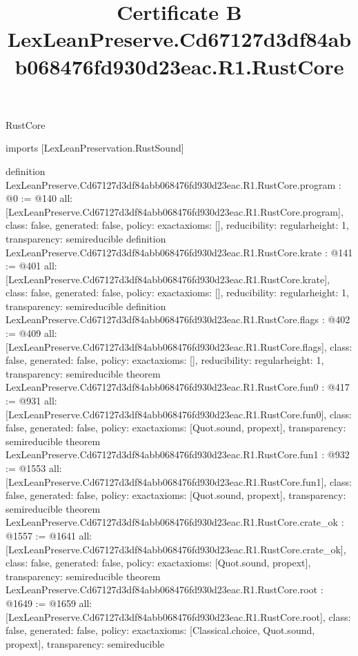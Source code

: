 \begin{lexlean}{RustCore}
\title{Certificate B LexLeanPreserve.Cd67127d3df84abb068476fd930d23eac.R1.RustCore}
\begin{coremodule}
imports [LexLeanPreservation.RustSound]

definition LexLeanPreserve.Cd67127d3df84abb068476fd930d23eac.R1.RustCore.program : @0 := @140 {
  all: [LexLeanPreserve.Cd67127d3df84abb068476fd930d23eac.R1.RustCore.program],
  class: false,
  generated: false,
  policy: exact{axioms: []},
  reducibility: regular{height: 1},
  transparency: semireducible
}
definition LexLeanPreserve.Cd67127d3df84abb068476fd930d23eac.R1.RustCore.krate : @141 := @401 {
  all: [LexLeanPreserve.Cd67127d3df84abb068476fd930d23eac.R1.RustCore.krate],
  class: false,
  generated: false,
  policy: exact{axioms: []},
  reducibility: regular{height: 1},
  transparency: semireducible
}
definition LexLeanPreserve.Cd67127d3df84abb068476fd930d23eac.R1.RustCore.flags : @402 := @409 {
  all: [LexLeanPreserve.Cd67127d3df84abb068476fd930d23eac.R1.RustCore.flags],
  class: false,
  generated: false,
  policy: exact{axioms: []},
  reducibility: regular{height: 1},
  transparency: semireducible
}
theorem LexLeanPreserve.Cd67127d3df84abb068476fd930d23eac.R1.RustCore.fun0 : @417 := @931 {
  all: [LexLeanPreserve.Cd67127d3df84abb068476fd930d23eac.R1.RustCore.fun0],
  class: false,
  generated: false,
  policy: exact{axioms: [Quot.sound, propext]},
  transparency: semireducible
}
theorem LexLeanPreserve.Cd67127d3df84abb068476fd930d23eac.R1.RustCore.fun1 : @932 := @1553 {
  all: [LexLeanPreserve.Cd67127d3df84abb068476fd930d23eac.R1.RustCore.fun1],
  class: false,
  generated: false,
  policy: exact{axioms: [Quot.sound, propext]},
  transparency: semireducible
}
theorem LexLeanPreserve.Cd67127d3df84abb068476fd930d23eac.R1.RustCore.crate_ok : @1557 := @1641 {
  all: [LexLeanPreserve.Cd67127d3df84abb068476fd930d23eac.R1.RustCore.crate_ok],
  class: false,
  generated: false,
  policy: exact{axioms: [Quot.sound, propext]},
  transparency: semireducible
}
theorem LexLeanPreserve.Cd67127d3df84abb068476fd930d23eac.R1.RustCore.root : @1649 := @1659 {
  all: [LexLeanPreserve.Cd67127d3df84abb068476fd930d23eac.R1.RustCore.root],
  class: false,
  generated: false,
  policy: exact{axioms: [Classical.choice, Quot.sound, propext]},
  transparency: semireducible
}


\end{coremodule}
\end{lexlean}
